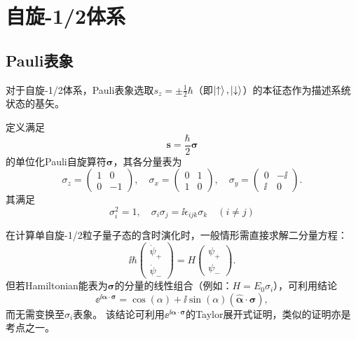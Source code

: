 \section{自旋-1/2体系}

\subsection{Pauli表象}

对于自旋-1/2体系，Pauli表象选取$s_z=\pm\frac12\hbar$（即$\ket{\uparrow},\ket{\downarrow}$）的本征态作为描述系统状态的基矢。

定义满足
\begin{equation}
    \bm{s} = \frac{\hbar}{2}\bm{\sigma}
\end{equation}
的单位化Pauli自旋算符$\bm{\sigma}$，其各分量表为
\begin{equation}
    \sigma_z = \begin{pmatrix}1& 0\\0&-1\end{pmatrix}, \quad
    \sigma_x = \begin{pmatrix}0& 1\\1& 0\end{pmatrix}, \quad
    \sigma_y = \begin{pmatrix}0&-\ii\\ \ii& 0\end{pmatrix}.
\end{equation}
其满足
\begin{equation}
    \sigma_i^2 = 1, \quad
    \sigma_i\sigma_j = \ii \epsilon_{ijk}\sigma_k \quad (i\ne j)
\end{equation}

在计算单自旋-1/2粒子量子态的含时演化时，一般情形需直接求解二分量\schrodinger 方程：
\begin{equation}
    \ii\hbar\begin{pmatrix}\dot{\psi}_+\\ \dot{\psi}_-\end{pmatrix} =
    H \begin{pmatrix}\psi_+\\ \psi_-\end{pmatrix}.
\end{equation}
但若Hamiltonian能表为$\bm{\sigma}$的分量的线性组合（例如：$H=E_0\sigma_i$），可利用结论
\begin{equation}
    \ee^{\ii \bm{\alpha}\cdot\bm{\sigma}} = \cos(\alpha) + \ii \sin(\alpha) (\hat{\bm{\alpha}}\cdot\bm{\sigma}),
\end{equation}
而无需变换至$\sigma_i$表象。
该结论可利用$\ee^{\ii \bm{\alpha}\cdot\bm{\sigma}}$的Taylor展开式证明，类似的证明亦是考点之一。


